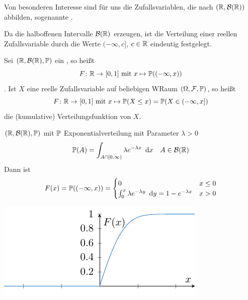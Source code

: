 Von besonderen Interesse sind für uns die Zufallsvariablen, die nach $(\R, \borel\R)$ abbilden, sogenannte .

Da die halboffenen Intervalle $\borel\R$ erzeugen, ist die Verteilung einer reellen Zufallsvariable durch die Werte $(-\infty, c]$, $c \in \R$ eindeutig festgelegt.

\begin{definition}[Verteilungsfunktion] \label{def: 1.16_verteilungsfunktion}
    Sei $(\R, \borel\R, \P)$ ein \WRaum, so heißt
    \begin{equation*}
        \abb{F}{\R}{[0,1]} \text{ mit } x \mapsto \P((-\infty, x))
    \end{equation*}
    .    
    Ist $X$ eine reelle Zufallsvariable auf beliebigen WRaum $(\Omega, \F, \P)$, so heißt
    \begin{equation*}
        \abb{F}{\R}{[0,1]} \text{ mit } x \mapsto \P(X \leq x) = \P(X \in (-\infty, x])
    \end{equation*} %
    die (kumulative) Verteilungsfunktion von $X$.
\end{definition}

\begin{beispiel}
    $(\R, \borel\R,\P)$ mit $\P$ Exponentialverteilung mit Parameter $\lambda > 0$
    \begin{equation*}
    \P(A) = \int_{A \cap [0,\infty)}\lambda e^{-\lambda x} \dx \quad A \in \borel\R
    \end{equation*}
    Dann ist
    \begin{equation*}
    F(x) = \P((-\infty, x)) = 
    \begin{cases}
        0 &x \le 0\\
        \int_{0}^{x} \lambda e^{-\lambda y} \dy = 1 - e^{-\lambda x} &x > 0
    \end{cases}\notag
    \end{equation*}
\end{beispiel}

\begin{center}
    \includegraphics{./stoch_abbildungen/exponentialverteilung_verteilungsfunktion.pdf}
\end{center}

